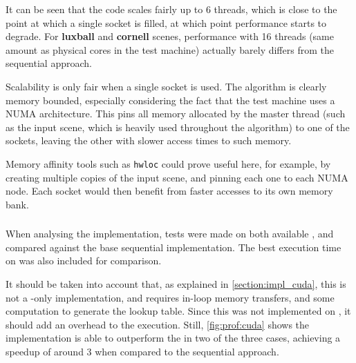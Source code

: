 \documentclass[main.tex]{subfiles}
\begin{document}
It can be seen that the code scales fairly up to 6 threads, which is close to the point at which a single \cpu socket is filled, at which point performance starts to degrade.
For \textbf{luxball} and \textbf{cornell} scenes, performance with 16 threads (same amount as physical \cpu cores in the test machine) actually barely differs from the sequential approach.

Scalability is only fair when a single socket is used. The algorithm is clearly memory bounded, especially considering the fact that the test machine uses a \acs{NUMA} architecture. This pins all memory allocated by the master thread (such as the input scene, which is heavily used throughout the algorithm) to one of the sockets, leaving the other with slower access times to such memory.

Memory affinity tools such as \texttt{hwloc} could prove useful here, for example, by creating multiple copies of the input scene, and pinning each one to each \acs{NUMA} node. Each socket would then benefit from faster accesses to its own memory bank.

\subsubsection{\gpu}

When analysing the \gpu implementation, tests were made on both available \gpus, and compared against the base sequential \cpu implementation. The best execution time on \cpu was also included for comparison.

It should be taken into account that, as explained in \cref{section:impl_cuda}, this is not a \gpu-only implementation, and requires in-loop memory transfers, and some \cpu computation to generate the lookup table. Since this was not implemented on \gpu, it should add an overhead to the execution. Still, \cref{fig:prof:cuda} shows the implementation is able to outperform the \cpu in two of the three cases, achieving a speedup of around 3 when compared to the sequential approach.

\end{document}
